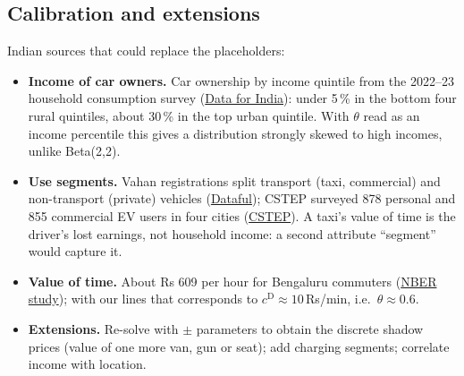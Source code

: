 \documentclass[11pt,a4paper]{article}
\newcommand{\pct}{\,\%}
\begin{document}
\subsection{Calibration and extensions}
\label{sec:calibration}
Indian sources that could replace the placeholders:
\begin{itemize}
  \item \textbf{Income of car owners.} Car ownership by income quintile from the 2022--23 household consumption survey (\href{https://www.dataforindia.com/vehicle-ownership/}{Data for India}): under 5\pct{} in the bottom four rural quintiles, about 30\pct{} in the top urban quintile. With $\theta$ read as an income percentile this gives a distribution strongly skewed to high incomes, unlike Beta(2,2).
  \item \textbf{Use segments.} Vahan registrations split transport (taxi, commercial) and non-transport (private) vehicles (\href{https://dataful.in/datasets/21146/}{Dataful}); CSTEP surveyed 878 personal and 855 commercial EV users in four cities (\href{https://cstep.in/?p=1521}{CSTEP}). A taxi's value of time is the driver's lost earnings, not household income: a second attribute ``segment'' would capture it.
  \item \textbf{Value of time.} About Rs 609 per hour for Bengaluru commuters (\href{https://www.nber.org/papers/w25218.pdf}{NBER study}); with our lines that corresponds to $c^{\mathrm D}\approx10$\,Rs/min, i.e.\ $\theta\approx0.6$.
  \item \textbf{Extensions.} Re-solve with $\pm$ parameters to obtain the discrete shadow prices (value of one more van, gun or seat); add charging segments; correlate income with location.
\end{itemize}

\end{document}
